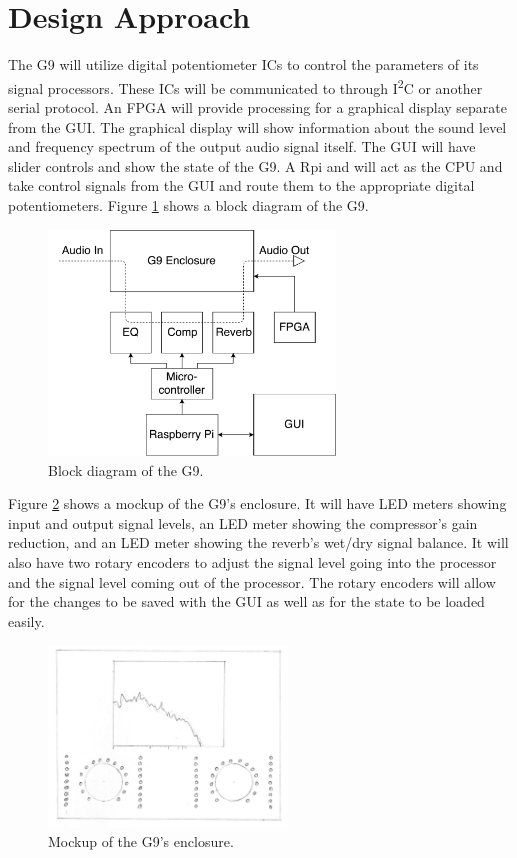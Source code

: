 \documentclass[journal]{IEEEtran}
\begin{document}
	
	\section{Design Approach}
	The G9 will utilize digital potentiometer ICs to control the parameters of its signal processors.  These ICs will be communicated to through I\textsuperscript{2}C or another serial protocol. An FPGA will provide processing for a graphical display separate from the GUI. The graphical display will show information about the sound level and frequency spectrum of the output audio signal itself. The GUI will have slider controls and show the state of the G9. A Rpi and will act as the CPU and take control signals from the GUI and route them to the appropriate digital potentiometers. Figure \ref{fig:blockDiagram} shows a block diagram of the G9.
	
	\begin{figure}
		\centering
		\includegraphics[width=3in]{blockDiagram}
		\caption{Block diagram of the G9. }
		\label{fig:blockDiagram}
	\end{figure}
	
	Figure \ref{fig:g9Enclosure} shows a mockup of the G9's enclosure. It will have LED meters showing input and output signal levels, an LED meter showing the compressor's gain reduction, and an LED meter showing the reverb's wet/dry signal balance. It will also have two rotary encoders to adjust the signal level going into the processor and the signal level coming out of the processor. The rotary encoders will allow for the changes to be saved with the GUI as well as for the state to be loaded easily.
	\begin{figure}
		\centering
		\includegraphics[width=2.5in]{g9Enclosure}
		\caption{Mockup of the G9's enclosure. }
		\label{fig:g9Enclosure}
	\end{figure}
	
\end{document}
